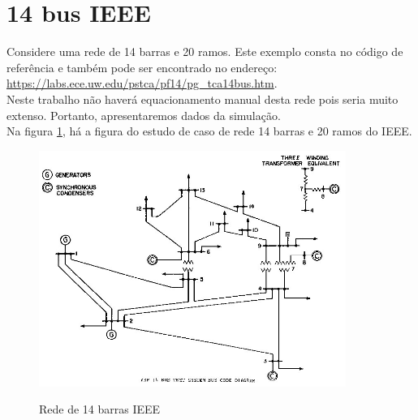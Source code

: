 \section{14 bus IEEE}
Considere uma rede de 14 barras e 20 ramos. Este exemplo consta no código de referência e também pode ser encontrado no endereço: \href{https://labs.ece.uw.edu/pstca/pf14/pg\_tca14bus.htm}{https://labs.ece.uw.edu/pstca/pf14/pg\_tca14bus.htm}.\\
Neste trabalho não haverá equacionamento manual desta rede pois seria muito extenso. Portanto, apresentaremos dados da simulação.\\
Na figura \ref{FigRede14barras}, há a figura do estudo de caso de rede 14 barras e 20 ramos do IEEE.
\begin{figure}[!htb]
\caption{Rede de 14 barras IEEE}
\centering %
\includegraphics[width=10cm]{figuras/14bus.jpg} 
\label{FigRede14barras}
\end{figure}

